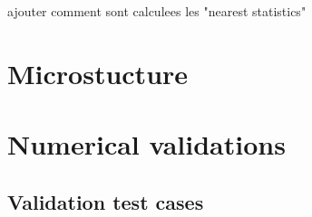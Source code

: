 \documentclass[12pt]{My_preprint}
\newcommand{\JL}[1]{\color{red}#1\color{black}}
\begin{document}
\JL{ajouter comment sont calculees les "nearest statistics"}

\section{Microstucture}



\appendix
\section{Numerical validations}
\label{ap:A}
\subsection{Validation test cases}

%



\end{document}
